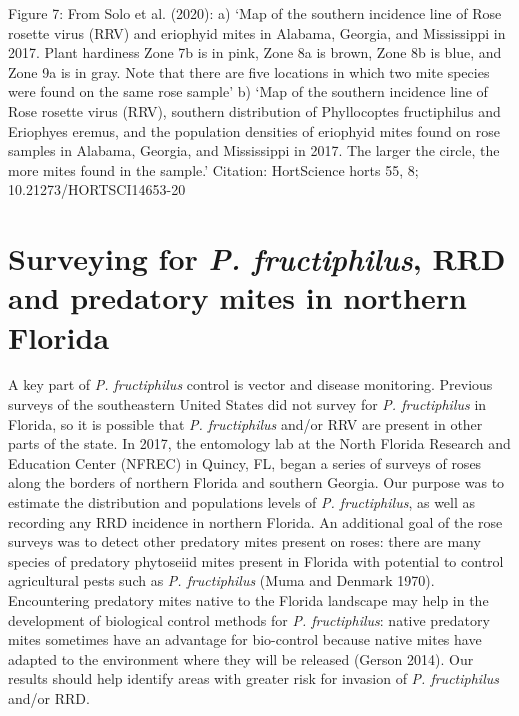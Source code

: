 \documentclass[12pt,final,CPage]{ufthesis}
\begin{document}
{  Figure 7: From Solo et al. (2020): a) `Map of the southern incidence line of Rose rosette virus (RRV) and eriophyid mites in Alabama, Georgia, and Mississippi in 2017. Plant hardiness Zone 7b is in pink, Zone 8a is brown, Zone 8b is blue, and Zone 9a is in gray. Note that there are five locations in which two mite species were found on the same rose sample' b) `Map of the southern incidence line of Rose rosette virus (RRV), southern distribution of Phyllocoptes fructiphilus and Eriophyes eremus, and the population densities of eriophyid mites found on rose samples in Alabama, Georgia, and Mississippi in 2017. The larger the circle, the more mites found in the sample.' Citation: HortScience horts 55, 8; 10.21273/HORTSCI14653-20

  \hypertarget{intro-survey}{%
  \section{\texorpdfstring{Surveying for \emph{P. fructiphilus}, RRD and predatory mites in northern Florida}{Surveying for P. fructiphilus, RRD and predatory mites in northern Florida}}\label{intro-survey}}

  A key part of \emph{P. fructiphilus} control is vector and disease monitoring. Previous surveys of the southeastern United States did not survey for \emph{P. fructiphilus} in Florida, so it is possible that \emph{P. fructiphilus} and/or RRV are present in other parts of the state. In 2017, the entomology lab at the North Florida Research and Education Center (NFREC) in Quincy, FL, began a series of surveys of roses along the borders of northern Florida and southern Georgia. Our purpose was to estimate the distribution and populations levels of \emph{P. fructiphilus}, as well as recording any RRD incidence in northern Florida. An additional goal of the rose surveys was to detect other predatory mites present on roses: there are many species of predatory phytoseiid mites present in Florida with potential to control agricultural pests such as \emph{P. fructiphilus} (Muma and Denmark 1970). Encountering predatory mites native to the Florida landscape may help in the development of biological control methods for \emph{P. fructiphilus}: native predatory mites sometimes have an advantage for bio-control because native mites have adapted to the environment where they will be released (Gerson 2014). Our results should help identify areas with greater risk for invasion of \emph{P. fructiphilus} and/or RRD.

  \hypertarget{intro-pheno}{%
}}
\end{document}
